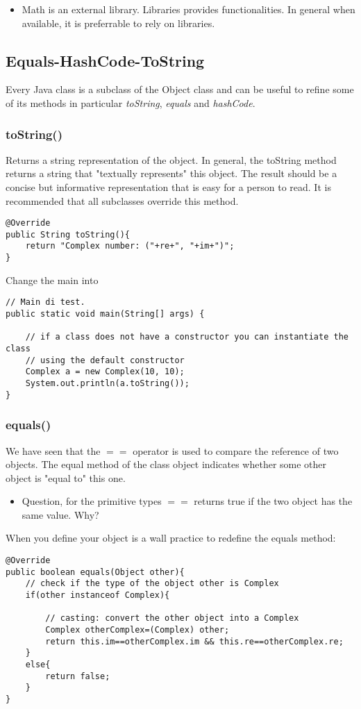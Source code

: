 \documentclass{article}
\begin{document}
\begin{itemize}
\item Math is an external library. Libraries provides functionalities. In general when available, it is preferrable to rely on libraries. 
\end{itemize}



\subsection{Equals-HashCode-ToString}
Every Java class is a subclass of the Object class and can be useful to refine some of its methods in particular \emph{toString}, \emph{equals} and \emph{hashCode}.

\subsubsection{toString()}
Returns a string representation of the object. In general, the toString method returns a string that "textually represents" this object. The result should be a concise but informative representation that is easy for a person to read. It is recommended that all subclasses override this method.
\begin{lstlisting}
@Override
public String toString(){
    return "Complex number: ("+re+", "+im+")";
}
\end{lstlisting}
Change the main into
\begin{lstlisting}
// Main di test.
public static void main(String[] args) {

	// if a class does not have a constructor you can instantiate the class
	// using the default constructor
	Complex a = new Complex(10, 10);
	System.out.println(a.toString());
}
\end{lstlisting}

\subsubsection{equals()}
We have seen that the $==$ operator is used to compare the reference of two objects. The equal method of the class object indicates whether some other object is "equal to" this one. 
\begin{itemize}
\item Question, for the primitive types $==$ returns true  if the two object has the same value. Why?
\end{itemize}

When you define your object is a wall practice to redefine the equals method:
\begin{lstlisting}
@Override
public boolean equals(Object other){
    // check if the type of the object other is Complex
    if(other instanceof Complex){
    
        // casting: convert the other object into a Complex
        Complex otherComplex=(Complex) other;
        return this.im==otherComplex.im && this.re==otherComplex.re;
    }
    else{
        return false;
    }
}
\end{lstlisting}
\end{document}
